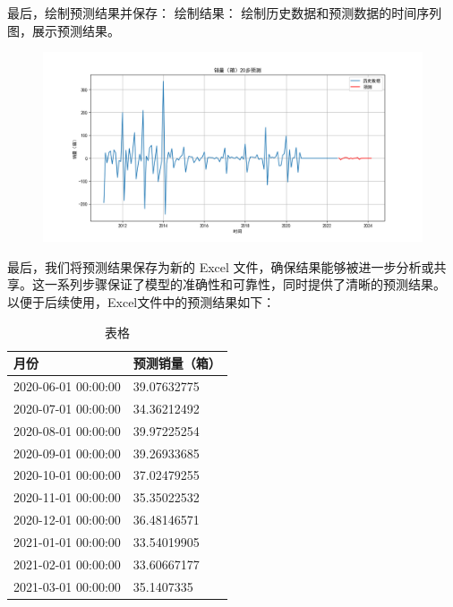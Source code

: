 \documentclass[a4paper]{article}
\begin{document}
	最后，绘制预测结果并保存：
	绘制结果：
	绘制历史数据和预测数据的时间序列图，展示预测结果。
	\begin{figure}[H]
		\centering
		\includegraphics[width=1.0\textwidth]{img/A1_2.png}
	\end{figure}

	最后，我们将预测结果保存为新的 Excel 文件，确保结果能够被进一步分析或共享。这一系列步骤保证了模型的准确性和可靠性，同时提供了清晰的预测结果。
	以便于后续使用，Excel文件中的预测结果如下：

	\setlength{\extrarowheight}{4pt}
	\begin{table}[H]

		\centering
	
		\begin{tabularx}{\textwidth}{|X|X|} %
	
		\hline
	
		月份 & 预测销量（箱）\\
	
		\hline
	
		2020-06-01 00:00:00	& 39.07632775\\
		\hline
		2020-07-01 00:00:00	& 34.36212492\\
		\hline
		2020-08-01 00:00:00	& 39.97225254\\
		\hline
		2020-09-01 00:00:00	& 39.26933685\\
		\hline
		2020-10-01 00:00:00	& 37.02479255\\
		\hline
		2020-11-01 00:00:00	& 35.35022532\\
		\hline
		2020-12-01 00:00:00	& 36.48146571\\
		\hline
		2021-01-01 00:00:00	& 33.54019905\\
		\hline
		2021-02-01 00:00:00	& 33.60667177\\
		\hline
		2021-03-01 00:00:00	& 35.1407335\\
	
		\hline
	
		\end{tabularx}
	
		\caption{表格}
	
	\end{table}
\end{document}
